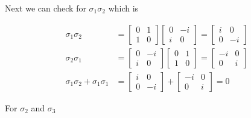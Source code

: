 \documentclass[11pt]{article}
\begin{document}
\begin{enumerate}
\begin{enumerate}
		            Next we can check for $\sigma_1 \sigma_2$ which is

		            \begin{align*}
			            \sigma_1 \sigma_2                     & =
			            \begin{bmatrix} 0 & 1 \\ 1 & 0 \end{bmatrix}
			            \begin{bmatrix} 0 & -i \\ i & 0 \end{bmatrix} =
			            \begin{bmatrix}
				            i & 0 \\ 0 & -i
			            \end{bmatrix}                           \\
			            \sigma_2 \sigma_1                     & =
			            \begin{bmatrix} 0 & -i \\ i & 0 \end{bmatrix}
			            \begin{bmatrix} 0 & 1 \\ 1 & 0 \end{bmatrix} =
			            \begin{bmatrix}
				            -i & 0 \\ 0 & i
			            \end{bmatrix}                           \\
			            \sigma_1 \sigma_2 + \sigma_1 \sigma_1 & =
			            \begin{bmatrix}
				            i & 0 \\ 0 & -i
			            \end{bmatrix} +
			            \begin{bmatrix}
				            -i & 0 \\ 0 & i
			            \end{bmatrix} = 0
		            \end{align*}

		            For $\sigma_2$ and $\sigma_3$


\end{enumerate}
\end{enumerate}
\end{document}

